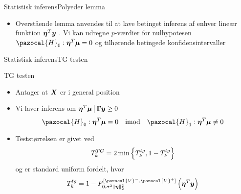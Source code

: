 \begin{frame}{Statistisk inferens}{Polyeder lemma}
\begin{itemize}
\item Overstående lemma anvendes til at lave betinget inferens af enhver lineær funktion $\boldsymbol \eta^T \bm{y} $ . Vi kan udregne $p$-værdier for nulhypotesen  $\pazocal{H}_0:\boldsymbol \eta^T \vmu  = 0$ og tilhørende betingede konfidensintervaller
\end{itemize}
\end{frame}

\begin{frame}{Statistisk inferens}{TG testen}
\begin{block}{TG testen}
\begin{itemize}
\item Antager at $\bm{X}$ er i general position
\item Vi laver inferens om $ \boldsymbol \eta^T \bm{\mu} \,\big\vert\, \boldsymbol \Gamma \bm{y} \geq 0 $
\begin{align*}
 \pazocal{H}_0 : \boldsymbol \eta^T \vmu = 0 \quad \text{imod} \quad  \pazocal{H}_1 : \boldsymbol \eta^T \vmu  \neq 0
\end{align*}
\item Teststørrelsen er givet ved
\begin{align*}
T_k^{TG} = 2 \min \cbr{T_k^{tg}, 1 - T_k^{tg} } 
\end{align*}
og er standard uniform fordelt, hvor 
\begin{align*}
T_k^{tg} & = 1 - F_{0, \sigma^2 \Vert \boldsymbol \eta \Vert^2_2}^{[\pazocal{V}^-, \pazocal{V}^+ ]} \del{\boldsymbol \eta^T \vy} \\
\end{align*}

\end{itemize}
\end{block}
\end{frame}

